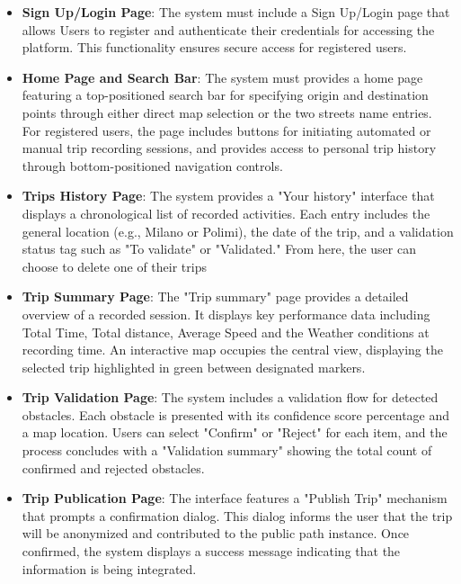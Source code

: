 \begin{itemize}
    \item \textbf{Sign Up/Login Page}: The system must include a Sign Up/Login page that allows Users to register and authenticate their credentials for accessing the platform. This functionality ensures secure access for registered users.

    \item \textbf{Home Page and Search Bar}: The system must provides a home page featuring a top-positioned search bar for specifying origin and destination points through either direct map selection or the two streets name entries. For registered users, the page includes buttons for initiating automated or manual trip recording sessions, and provides access to personal trip history through bottom-positioned navigation controls.

    \item \textbf{Trips History Page}: The system provides a "Your history" interface that displays a chronological list of recorded activities. Each entry includes the general location (e.g., Milano or Polimi), the date of the trip, and a validation status tag such as "To validate" or "Validated." From here, the user can choose to delete one of their trips

    \item \textbf{Trip Summary Page}: The "Trip summary" page provides a detailed overview of a recorded session. It displays key performance data including Total Time, Total distance, Average Speed and the Weather conditions at recording time. An interactive map occupies the central view, displaying the selected trip highlighted in green between designated markers.

    \item \textbf{Trip Validation Page}: The system includes a validation flow for detected obstacles. Each obstacle is presented with its confidence score percentage and a map location. Users can select "Confirm" or "Reject" for each item, and the process concludes with a "Validation summary" showing the total count of confirmed and rejected obstacles.

    \item \textbf{Trip Publication Page}: The interface features a "Publish Trip" mechanism that prompts a confirmation dialog. This dialog informs the user that the trip will be anonymized and contributed to the public path instance. Once confirmed, the system displays a success message indicating that the information is being integrated.


\end{itemize}
